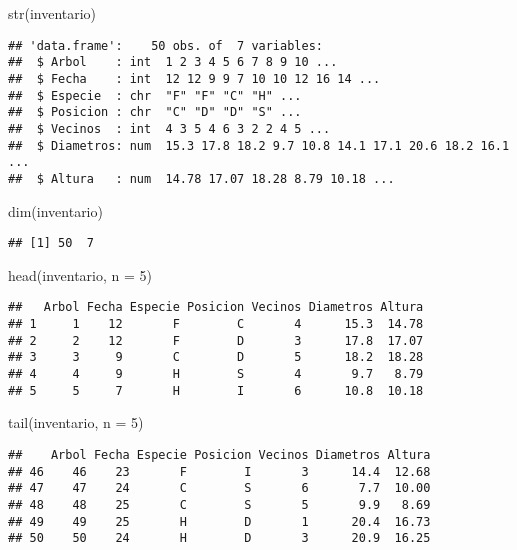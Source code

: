 \documentclass[
]{article}
\newenvironment{Shaded}{\begin{snugshade}}{\end{snugshade}}
\newcommand{\AttributeTok}[1]{\textcolor[rgb]{0.77,0.63,0.00}{#1}}
\newcommand{\DecValTok}[1]{\textcolor[rgb]{0.00,0.00,0.81}{#1}}
\newcommand{\FunctionTok}[1]{\textcolor[rgb]{0.00,0.00,0.00}{#1}}
\newcommand{\NormalTok}[1]{#1}
\begin{document}
\begin{Shaded}
\begin{Highlighting}[]
\FunctionTok{str}\NormalTok{(inventario)}
\end{Highlighting}
\end{Shaded}

\begin{verbatim}
## 'data.frame':    50 obs. of  7 variables:
##  $ Arbol    : int  1 2 3 4 5 6 7 8 9 10 ...
##  $ Fecha    : int  12 12 9 9 7 10 10 12 16 14 ...
##  $ Especie  : chr  "F" "F" "C" "H" ...
##  $ Posicion : chr  "C" "D" "D" "S" ...
##  $ Vecinos  : int  4 3 5 4 6 3 2 2 4 5 ...
##  $ Diametros: num  15.3 17.8 18.2 9.7 10.8 14.1 17.1 20.6 18.2 16.1 ...
##  $ Altura   : num  14.78 17.07 18.28 8.79 10.18 ...
\end{verbatim}

\begin{Shaded}
\begin{Highlighting}[]
\FunctionTok{dim}\NormalTok{(inventario)}
\end{Highlighting}
\end{Shaded}

\begin{verbatim}
## [1] 50  7
\end{verbatim}

\begin{Shaded}
\begin{Highlighting}[]
\FunctionTok{head}\NormalTok{(inventario, }\AttributeTok{n =} \DecValTok{5}\NormalTok{)}
\end{Highlighting}
\end{Shaded}

\begin{verbatim}
##   Arbol Fecha Especie Posicion Vecinos Diametros Altura
## 1     1    12       F        C       4      15.3  14.78
## 2     2    12       F        D       3      17.8  17.07
## 3     3     9       C        D       5      18.2  18.28
## 4     4     9       H        S       4       9.7   8.79
## 5     5     7       H        I       6      10.8  10.18
\end{verbatim}

\begin{Shaded}
\begin{Highlighting}[]
\FunctionTok{tail}\NormalTok{(inventario, }\AttributeTok{n =} \DecValTok{5}\NormalTok{)}
\end{Highlighting}
\end{Shaded}

\begin{verbatim}
##    Arbol Fecha Especie Posicion Vecinos Diametros Altura
## 46    46    23       F        I       3      14.4  12.68
## 47    47    24       C        S       6       7.7  10.00
## 48    48    25       C        S       5       9.9   8.69
## 49    49    25       H        D       1      20.4  16.73
## 50    50    24       H        D       3      20.9  16.25
\end{verbatim}
\end{document}
